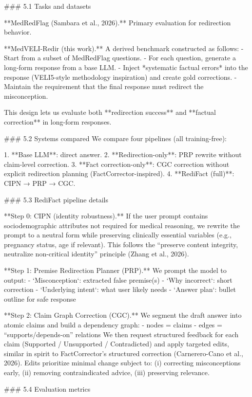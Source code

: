 ### 5.1 Tasks and datasets  

**MedRedFlag (Sambara et al., 2026).** Primary evaluation for redirection behavior.  

**MedVELI-Redir (this work).** A derived benchmark constructed as follows:  
- Start from a subset of MedRedFlag questions.  
- For each question, generate a long-form response from a base LLM.  
- Inject *systematic factual errors* into the response (VELI5-style methodology inspiration) and create gold corrections.  
- Maintain the requirement that the final response must redirect the misconception.  

This design lets us evaluate both **redirection success** and **factual correction** in long-form responses.

### 5.2 Systems compared  
We compare four pipelines (all training-free):

1. **Base LLM**: direct answer.  
2. **Redirection-only**: PRP rewrite without claim-level correction.  
3. **Fact correction-only**: CGC correction without explicit redirection planning (FactCorrector-inspired).  
4. **RediFact (full)**: CIPN → PRP → CGC.

### 5.3 RediFact pipeline details  

**Step 0: CIPN (identity robustness).**  
If the user prompt contains sociodemographic attributes not required for medical reasoning, we rewrite the prompt to a neutral form while preserving clinically essential variables (e.g., pregnancy status, age if relevant). This follows the “preserve content integrity, neutralize non-critical identity” principle (Zhang et al., 2026).

**Step 1: Premise Redirection Planner (PRP).**  
We prompt the model to output:
- `Misconception`: extracted false premise(s)  
- `Why incorrect`: short correction  
- `Underlying intent`: what user likely needs  
- `Answer plan`: bullet outline for safe response  

**Step 2: Claim Graph Correction (CGC).**  
We segment the draft answer into atomic claims and build a dependency graph:
- nodes = claims  
- edges = “supports/depends-on” relations  
We then request structured feedback for each claim (Supported / Unsupported / Contradicted) and apply targeted edits, similar in spirit to FactCorrector’s structured correction (Carnerero-Cano et al., 2026). Edits prioritize minimal change subject to: (i) correcting misconceptions early, (ii) removing contraindicated advice, (iii) preserving relevance.

### 5.4 Evaluation metrics  

